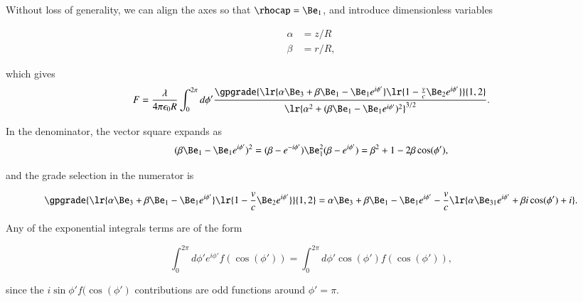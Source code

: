Without loss of generality, we can align the axes so that \( \rhocap = \Be_1 \), and
introduce dimensionless variables

\begin{dmath}\label{eqn:ringField:100}
\begin{aligned}
\alpha &= z/R \\
\beta &= r/R,
\end{aligned}
\end{dmath}

which gives
\begin{dmath}\label{eqn:ringField:120}
F
= \frac{\lambda}{4 \pi \epsilon_0 R} \int_0^{2\pi} d\phi' \frac{\gpgrade{ \lr{ \alpha \Be_3 + \beta \Be_1 - \Be_1 e^{i\phi'} } \lr{ 1 - \frac{v}{c} \Be_2 e^{i\phi'} } }{1,2} } { \lr{ \alpha^2 + (\beta \Be_1 - \Be_1 e^{i\phi'})^2}^{3/2} }.
\end{dmath}

In the denominator, the vector square expands as
\begin{dmath}\label{eqn:ringField:140}
(\beta \Be_1 - \Be_1 e^{i\phi'})^2
=
(\beta - e^{-i\phi'}) \Be_1^2 (\beta - e^{i\phi'})
=
\beta^2 + 1 - 2 \beta \cos(\phi'),
\end{dmath}

and the grade selection in the numerator is

\begin{dmath}\label{eqn:ringField:160}
\gpgrade{ \lr{ \alpha \Be_3 + \beta \Be_1 - \Be_1 e^{i\phi'} } \lr{ 1 - \frac{v}{c} \Be_2 e^{i\phi'}}}{1,2}
=
\alpha \Be_3 + \beta \Be_1 - \Be_1 e^{i\phi'}
-\frac{v}{c}\lr{ \alpha \Be_{31} e^{i\phi'} + \beta i \cos(\phi') + i }.
\end{dmath}

Any of the exponential integrals terms
are of the form

\begin{dmath}\label{eqn:ringField:180}
\int_0^{2\pi} d\phi' e^{i\phi'} f(\cos(\phi')) = \int_0^{2\pi} d\phi' \cos(\phi') f(\cos(\phi')),
\end{dmath}

since
the \( i \sin\phi' f(\cos(\phi') \) contributions are odd functions around \( \phi' = \pi \).

